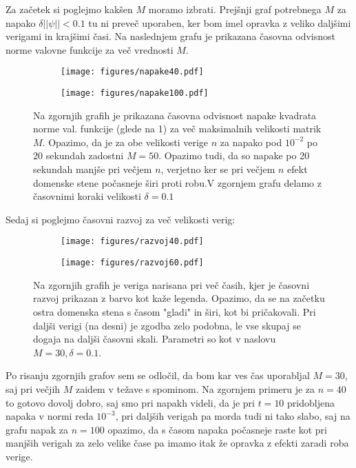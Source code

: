 \documentclass{article}
\begin{document}
Za začetek si poglejmo kakšen $M$ moramo izbrati. Prejšnji graf potrebnega $M$ za napako $\delta ||\psi|| < 0.1$ tu ni preveč uporaben, ker bom imel opravka z veliko daljšimi verigami in krajšimi časi.
Na naslednjem grafu je prikazana časovna odvisnost norme valovne funkcije za več vrednosti $M$.
\begin{figure}[H]
\centering
\begin{subfigure}{.49\textwidth}
\texttt{[image: figures/napake40.pdf]}
\end{subfigure}
\begin{subfigure}{.49\textwidth}
\texttt{[image: figures/napake100.pdf]}
\end{subfigure}
\caption*{Na zgornjih grafih je prikazana časovna odvisnost napake kvadrata norme val. funkcije (glede na 1) za več maksimalnih velikosti matrik $M$. Opazimo, da je za obe velikosti verige $n$ za napako pod $10^{-2}$ po 20 sekundah zadostni $M=50$. Opazimo tudi, da so napake po 20 sekundah manjše pri večjem $n$, verjetno ker se pri večjem $n$ efekt domenske stene počasneje širi proti robu.V zgornjem grafu delamo z časovnimi koraki velikosti $\delta=0.1$ }
\end{figure}

Sedaj si poglejmo časovni razvoj za več velikosti verig:
 
\begin{figure}[H]
\centering
\begin{subfigure}{.49\textwidth}
\texttt{[image: figures/razvoj40.pdf]}
\end{subfigure}
\begin{subfigure}{.49\textwidth}
\texttt{[image: figures/razvoj60.pdf]}
\end{subfigure}
\caption*{Na zgornjih grafih je veriga narisana pri več časih, kjer je časovni razvoj prikazan z barvo kot kaže legenda. Opazimo, da se na začetku ostra domenska stena s časom "gladi" in širi, kot bi pričakovali. Pri daljši verigi (na desni) je zgodba zelo podobna, le vse skupaj se dogaja na daljši časovni skali. Parametri so kot v naslovu $M=30, \delta=0.1$.}
\end{figure}

Po risanju zgornjih grafov sem se odločil, da bom kar ves čas uporabljal $M=30$, saj pri večjih $M$ zaidem v težave s spominom. Na zgornjem primeru je za $n=40$ to gotovo dovolj dobro, saj smo pri napakh videli, da je pri $t=10$ pridobljena napaka v normi reda $10^{-3}$, pri daljših verigah pa morda tudi ni tako slabo, saj na grafu napak za $n=100$ opazimo, da s časom napaka počasneje raste kot pri manjših verigah za zelo velike čase pa imamo itak že opravka z efekti zaradi roba verige.
\end{document}

